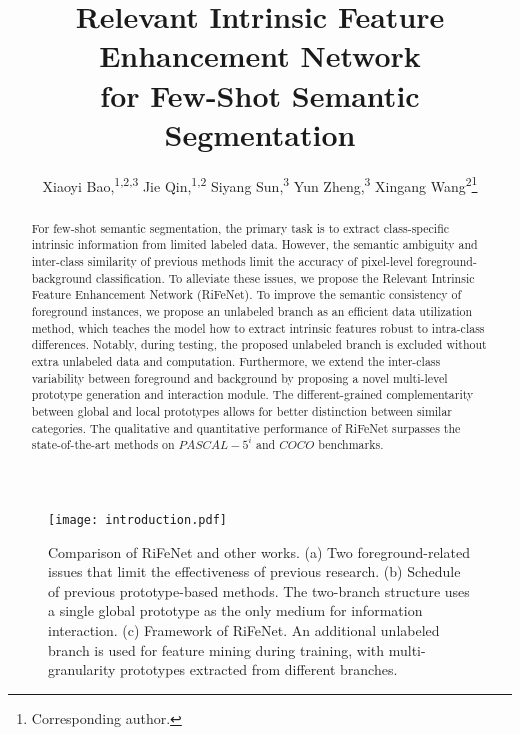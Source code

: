 \documentclass[letterpaper]{article} %
\title{Relevant Intrinsic Feature Enhancement Network\\
for Few-Shot Semantic Segmentation}
\author{
Xiaoyi Bao,\equalcontrib\textsuperscript{\rm 1,\rm 2,\rm 3}
Jie Qin,\equalcontrib\textsuperscript{\rm 1,\rm 2}
Siyang Sun,\textsuperscript{\rm 3}
Yun Zheng,\textsuperscript{\rm 3}
Xingang Wang\textsuperscript{\rm 2}\thanks{Corresponding author.}
}
\begin{document}
\maketitle

\begin{abstract}
For few-shot semantic segmentation, the primary task is to extract class-specific intrinsic information from limited labeled data. However, the semantic ambiguity and inter-class similarity of previous methods limit the accuracy of pixel-level foreground-background classification. To alleviate these issues, we propose the Relevant Intrinsic Feature Enhancement Network (RiFeNet). To improve the semantic consistency of foreground instances, we propose an unlabeled branch as an efficient data utilization method, which teaches the model how to extract intrinsic features robust to intra-class differences. Notably, during testing, the proposed unlabeled branch is excluded without extra unlabeled data and computation. Furthermore, we extend the inter-class variability between foreground and background by proposing a novel multi-level prototype generation and interaction module. The different-grained complementarity between global and local prototypes allows for better distinction between similar categories. The qualitative and quantitative performance of RiFeNet surpasses the state-of-the-art methods on $PASCAL-5^i$ and $COCO$ benchmarks.

\end{abstract}

\begin{figure}[!t]
\centering
\texttt{[image: introduction.pdf]}

\caption{Comparison of RiFeNet and other works. (a) Two foreground-related issues that limit the effectiveness of previous research. (b) Schedule of previous prototype-based methods. The two-branch structure uses a single global prototype as the only medium for information interaction. (c) Framework of RiFeNet. An additional unlabeled branch is used for feature mining during training, with multi-granularity prototypes extracted from different branches. }
\label{introduction}
\end{figure}
\end{document}
